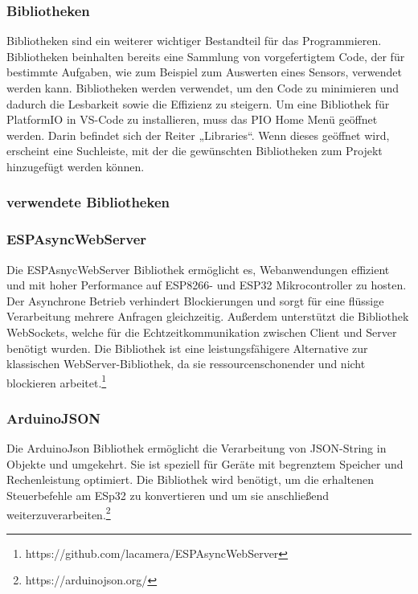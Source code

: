 \documentclass[ngerman,12pt,a4paper]{article}
\begin{document}
	 	
	 	\subsubsection{Bibliotheken}
	 	
	 Bibliotheken sind ein weiterer wichtiger Bestandteil für das Programmieren. Bibliotheken beinhalten bereits eine Sammlung von vorgefertigtem Code, der für bestimmte Aufgaben, wie zum Beispiel zum Auswerten eines Sensors, verwendet werden kann. Bibliotheken werden verwendet, um den Code zu minimieren und dadurch die Lesbarkeit sowie die Effizienz zu steigern. Um eine Bibliothek für PlatformIO in VS-Code zu installieren, muss das PIO Home Menü geöffnet werden. Darin befindet sich der Reiter „Libraries“. Wenn dieses geöffnet wird, erscheint eine Suchleiste, mit der die gewünschten Bibliotheken zum Projekt hinzugefügt werden können.
	 
		\subsubsection{verwendete Bibliotheken}
		
			\subsubsection*{ESPAsyncWebServer}
			
	Die ESPAsnycWebServer Bibliothek ermöglicht es, Webanwendungen effizient und mit hoher Performance auf ESP8266- und ESP32 Mikrocontroller zu hosten. Der Asynchrone Betrieb verhindert Blockierungen und sorgt für eine flüssige Verarbeitung mehrere Anfragen gleichzeitig. Außerdem unterstützt die Bibliothek WebSockets, welche für die Echtzeitkommunikation zwischen Client und Server benötigt wurden. Die Bibliothek ist eine leistungsfähigere Alternative zur klassischen WebServer-Bibliothek, da sie ressourcenschonender und nicht blockieren arbeitet.\footnote{https://github.com/lacamera/ESPAsyncWebServer}
	
			\subsubsection*{ArduinoJSON}
			
	Die ArduinoJson Bibliothek ermöglicht die Verarbeitung von JSON-String in Objekte und umgekehrt. Sie ist speziell für Geräte mit begrenztem Speicher und Rechenleistung optimiert. Die Bibliothek wird benötigt, um die erhaltenen Steuerbefehle am ESp32 zu konvertieren und um sie anschließend weiterzuverarbeiten.\footnote{https://arduinojson.org/}
			
\end{document}
